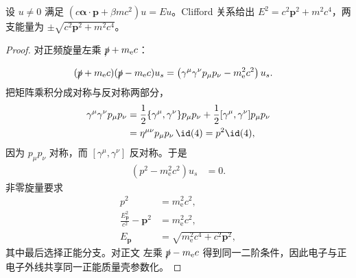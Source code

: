 \begin{proposition}
设 $u\ne0$ 满足 $(c\boldsymbol\alpha\cdot\mathbf p+\beta mc^2)u=Eu$。Clifford 关系给出 $E^2=c^2\mathbf p^2+m^2c^4$，两支能量为 $\pm\sqrt{c^2\mathbf p^2+m^2c^4}$。
\end{proposition}
\begin{proof}
对正频旋量左乘 $\slashed p+m_{\mathrm e} c$：

\begin{align*}
 (\slashed p+m_{\mathrm e} c)(\slashed p-m_{\mathrm e} c)u_s
 &=\left(\gamma^\mu\gamma^\nu p_\mu p_\nu-m_{\mathrm e}^2c^2\right)u_s.
\end{align*}
把矩阵乘积分成对称与反对称两部分，
\begin{align*}
 \gamma^\mu\gamma^\nu p_\mu p_\nu
 &=\frac12\{\gamma^\mu,\gamma^\nu\}p_\mu p_\nu
 +\frac12[\gamma^\mu,\gamma^\nu]p_\mu p_\nu\\
 &=\eta^{\mu\nu}p_\mu p_\nu\,\id(4)
 =p^2\id(4),
\end{align*}
因为 $p_\mu p_\nu$ 对称，而 $[\gamma^\mu,\gamma^\nu]$ 反对称。于是
\begin{align*}
 (p^2-m_{\mathrm e}^2c^2)u_s&=0.
\end{align*}
非零旋量要求
\begin{align*}
 p^2&=m_{\mathrm e}^2c^2,\\
 \frac{E_{\mathbf p}^2}{c^2}-\mathbf p^2&=m_{\mathrm e}^2c^2,\\
 E_{\mathbf p}&=\sqrt{m_{\mathrm e}^2c^4+c^2\mathbf p^2},
\end{align*}
其中最后选择正能分支。对正文 左乘 $\slashed p-m_{\mathrm e} c$ 得到同一二阶条件，因此电子与正电子外线共享同一正能质量壳参数化。
\end{proof}

